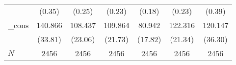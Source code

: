 {\begin{tabular}{l*{6}{c}}
            &                   (0.35)         &                   (0.25)         &                   (0.23)         &                   (0.18)         &                   (0.23)         &                   (0.39)         \\
\_cons      &                  140.866\sym{***}&                  108.437\sym{***}&                  109.864\sym{***}&                   80.942\sym{***}&                  122.316\sym{***}&                  120.147\sym{***}\\
            &                  (33.81)         &                  (23.06)         &                  (21.73)         &                  (17.82)         &                  (21.34)         &                  (36.30)         \\
\hline
\(N\)       &                     2456         &                     2456         &                     2456         &                     2456         &                     2456         &                     2456         \\
\hline\hline
\end{tabular}
}
